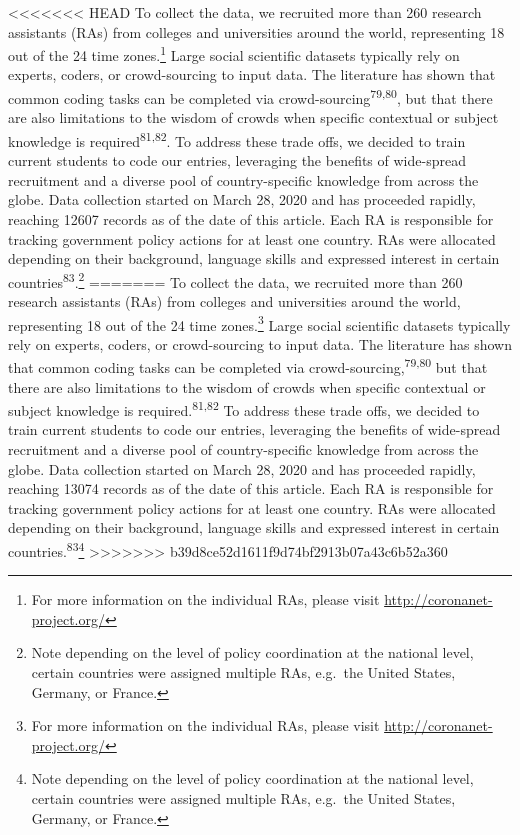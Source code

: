 \documentclass[]{article}
\let\rmarkdownfootnote\footnote%
\def\footnote{\protect\rmarkdownfootnote}
\begin{document}
<<<<<<< HEAD
To collect the data, we recruited more than 260 research assistants (RAs) from colleges and universities around the world, representing 18 out of the 24 time zones.\footnote{For more information on the individual RAs, please visit \url{http://coronanet-project.org/}} Large social scientific datasets typically rely on experts, coders, or crowd-sourcing to input data. The literature has shown that common coding tasks can be completed via crowd-sourcing\textsuperscript{79,80}, but that there are also limitations to the wisdom of crowds when specific contextual or subject knowledge is required\textsuperscript{81,82}. To address these trade offs, we decided to train current students to code our entries, leveraging the benefits of wide-spread recruitment and a diverse pool of country-specific knowledge from across the globe. Data collection started on March 28, 2020 and has proceeded rapidly, reaching 12607 records as of the date of this article. Each RA is responsible for tracking government policy actions for at least one country. RAs were allocated depending on their background, language skills and expressed interest in certain countries\textsuperscript{83}.\footnote{Note depending on the level of policy coordination at the national level, certain countries were assigned multiple RAs, e.g.~the United States, Germany, or France.}
=======
To collect the data, we recruited more than 260 research assistants (RAs) from colleges and universities around the world, representing 18 out of the 24 time zones.\footnote{For more information on the individual RAs, please visit \url{http://coronanet-project.org/}} Large social scientific datasets typically rely on experts, coders, or crowd-sourcing to input data. The literature has shown that common coding tasks can be completed via crowd-sourcing,\textsuperscript{79,80} but that there are also limitations to the wisdom of crowds when specific contextual or subject knowledge is required.\textsuperscript{81,82} To address these trade offs, we decided to train current students to code our entries, leveraging the benefits of wide-spread recruitment and a diverse pool of country-specific knowledge from across the globe. Data collection started on March 28, 2020 and has proceeded rapidly, reaching 13074 records as of the date of this article. Each RA is responsible for tracking government policy actions for at least one country. RAs were allocated depending on their background, language skills and expressed interest in certain countries.\textsuperscript{83}\footnote{Note depending on the level of policy coordination at the national level, certain countries were assigned multiple RAs, e.g.~the United States, Germany, or France.}
>>>>>>> b39d8ce52d1611f9d74bf2913b07a43c6b52a360
\end{document}
